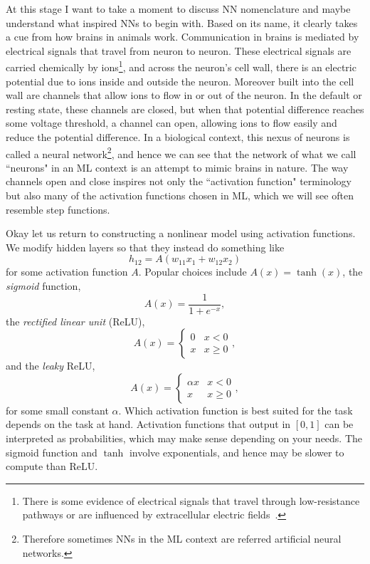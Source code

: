 At this stage I want to take a moment to discuss NN nomenclature and maybe
understand what inspired NNs to begin with. 
Based on its name, it clearly takes a cue from how
brains in animals work. Communication in brains is mediated by electrical
signals that travel from neuron to neuron. These electrical signals are
carried chemically by ions\footnote{There is some evidence
of electrical signals that travel through low-resistance pathways or
are influenced by extracellular electric fields~\cite{faber_two_2018}.},
and across the neuron's cell wall, there is an electric potential due to ions 
inside and outside the neuron. Moreover built into the cell wall are channels
that allow ions to flow in or out of the neuron. In the default or resting
state, these channels are closed, but when that potential difference reaches
some voltage threshold, a channel can open, allowing ions to flow easily
and reduce the potential difference. In a biological context, this
nexus of neurons is called a neural network\footnote{Therefore sometimes NNs
in the ML context are referred artificial neural networks.}, and hence
we can see that the network of what we call ``neurons" in an ML context
is an attempt to mimic brains in nature. The way channels open and close
 inspires not only the ``activation function" terminology but also many of 
the activation functions chosen in ML, which we will see often resemble 
step functions.

Okay let us return to constructing a nonlinear model using activation functions.
We modify hidden layers so that they instead do something like
\begin{equation}
h_{12} = A\left(w_{11}x_1+w_{12}x_2\right)
\end{equation}
for some activation function $A$. Popular choices include
$A(x)=\tanh(x)$, the {\it sigmoid} function,
\begin{equation}
A(x)=\frac{1}{1+e^{-x}},
\end{equation}
the {\it rectified linear unit} (ReLU),
\begin{equation}
A(x)= \begin{cases}0 & x<0 \\ x & x \geq 0\end{cases},
\end{equation}
and the {\it leaky} ReLU, 
\begin{equation}
A(x)= \begin{cases}\alpha x & x<0 \\ x & x \geq 0\end{cases},
\end{equation}
for some small constant $\alpha$. Which activation function is best suited
for the task depends on the task at hand. Activation functions that output
in $[0,1]$ can be interpreted as probabilities, which may make sense
depending on your needs. The sigmoid function and $\tanh$ involve
exponentials, and hence may be slower to compute than ReLU. 

